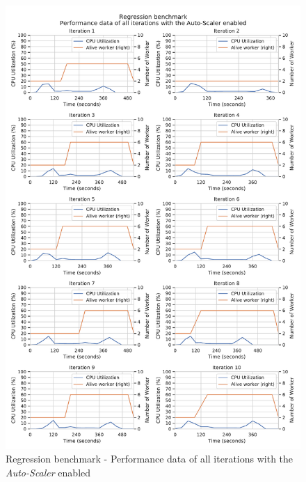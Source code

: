 \begin{figure}[h]
\centering
\includegraphics[scale=0.5]{images/appendix/evaluation_data/regression_benchmark/regression_auto-scaler_performance}
\caption{Regression benchmark - Performance data of all iterations with the \textit{Auto-Scaler} enabled}
\label{fig:appendix_eval_regression_auto-scaler}
\end{figure}
